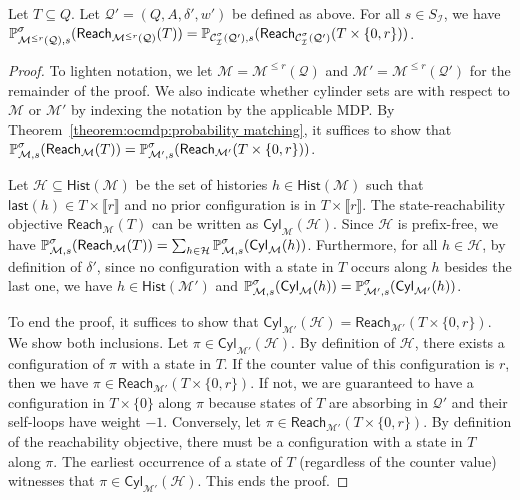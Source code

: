 \documentclass[a4paper,UKenglish,cleveref,autoref,thm-restate,colorlinks]{lipics-v2021}
\newcommand{\integerInterval}[1]{\llbracket{}#1\rrbracket{}}
\newcommand{\cylVerb}[2]{\mathsf{Cyl}_{#1}(#2)}
\newcommand{\mdp}{\mathcal{M}}
\newcommand{\mdpStateSpace}{S}
\newcommand{\play}{\pi}
\newcommand{\histSet}[1]{\mathsf{Hist}(#1)}
\newcommand{\histPart}{\mathcal{H}}
\newcommand{\hist}{h}
\newcommand{\last}[1]{\mathsf{last}(#1)}
\newcommand{\weight}{w}
\newcommand{\ocmdp}{\mathcal{Q}}
\newcommand{\ocmdpFin}[2]{\mdp^{\leq #2}(#1)}
\newcommand{\ocStateSpace}{Q}
\newcommand{\ocConfig}{s}
\newcommand{\ocActionSpace}{A}
\newcommand{\ocTrans}{\delta}
\newcommand{\counterUB}{r}
\newcommand{\mchain}{\mathcal{C}}
\newcommand{\intPart}{\mathcal{I}}
\newcommand{\compressChainB}{\mchain^{\strat}_{\intPart}({\ocmdp'})}
\newcommand{\compressChainStateSpace}{\mdpStateSpace_{\intPart}}
\newcommand{\reachVerb}[2]{\mathsf{Reach}_{#1}(#2)}
\newcommand{\target}{T}
\newcommand{\stratGeneric}[1]{{\sigma_{#1}}}
\newcommand{\strat}{\stratGeneric{}}
\begin{document}
\begin{theorem}\label{theorem:ocmdp:probability:reach}
    Let $\target\subseteq\ocStateSpace$.
  Let $\ocmdp' = (\ocStateSpace, \ocActionSpace, \ocTrans', \weight')$ be defined as above. For all $\ocConfig\in\compressChainStateSpace$, we have
  $\probaGverb{\ocmdpFin{\ocmdp}{\counterUB}}{\ocConfig}{\strat}(\reachVerb{\ocmdpFin{\ocmdp}{\counterUB}}{\target}) =
  \probaMCverb{\compressChainB}{\ocConfig}(\reachVerb{\compressChainB}{\target\times\{0, \counterUB\}})$.
\end{theorem}
\begin{proof}
    To lighten notation, we let $\mdp = \ocmdpFin{\ocmdp}{\counterUB}$ and $\mdp' = \ocmdpFin{\ocmdp'}{\counterUB}$ for the remainder of the proof.
  We also indicate whether cylinder sets are with respect to $\mdp$ or $\mdp'$ by indexing the notation by the applicable MDP.
  By Theorem~\ref{theorem:ocmdp:probability matching}, it suffices to show that $\probaGverb{\mdp}{\ocConfig}{\strat}(\reachVerb{\mdp}{\target}) =\probaGverb{\mdp'}{\ocConfig}{\strat}(\reachVerb{\mdp'}{\target\times\{0, \counterUB\}})$.
  
  Let $\histPart\subseteq\histSet{\mdp}$ be the set of histories $\hist\in\histSet{\mdp}$ such that $\last{\hist}\in\target\times\integerInterval{\counterUB}$ and no prior configuration is in $\target\times\integerInterval{\counterUB}$.
  The state-reachability objective $\reachVerb{\mdp}{\target}$ can be written as $\cylVerb{\mdp}{\histPart}$.
  Since $\histPart$ is prefix-free, we have $\probaGverb{\mdp}{\ocConfig}{\strat}(\reachVerb{\mdp}{\target}) = \sum_{\hist\in\histPart}\probaGverb{\mdp}{\ocConfig}{\strat}(\cylVerb{\mdp}{\hist})$.
  Furthermore, for all $\hist\in\histPart$, by definition of $\ocTrans'$, since no configuration with a state in $\target$ occurs along $\hist$ besides the last one, we have $\hist\in\histSet{\mdp'}$ and $\probaGverb{\mdp}{\ocConfig}{\strat}(\cylVerb{\mdp}{\hist}) =\probaGverb{\mdp'}{\ocConfig}{\strat}(\cylVerb{\mdp'}{\hist})$.

  To end the proof, it suffices to show that $\cylVerb{\mdp'}{\histPart} = \reachVerb{\mdp'}{\target\times\{0, \counterUB\}}$.
  We show both inclusions.
  Let $\play\in\cylVerb{\mdp'}{\histPart}$.
  By definition of $\histPart$, there exists a configuration of $\play$ with a state in $\target$.
  If the counter value of this configuration is $\counterUB$, then we have $\play\in\reachVerb{\mdp'}{\target\times\{0, \counterUB\}}$.
  If not, we are guaranteed to have a configuration in $\target\times\{0\}$ along $\play$ because states of $\target$ are absorbing in $\ocmdp'$ and their self-loops have weight $-1$.
  Conversely, let $\play\in\reachVerb{\mdp'}{\target\times\{0, \counterUB\}}$.
  By definition of the reachability objective, there must be a configuration with a state in $\target$ along $\play$.
  The earliest occurrence of a state of $\target$ (regardless of the counter value) witnesses that $\play\in\cylVerb{\mdp'}{\histPart}$.
  This ends the proof.
\end{proof}
\end{document}
